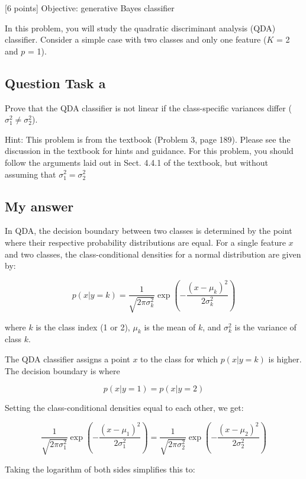 \documentclass[
]{article}
\begin{document}
{[}6 points{]} Objective: generative Bayes classifier

In this problem, you will study the quadratic discriminant analysis
(QDA) classifier. Consider a simple case with two classes and only one
feature (\(K\) = 2 and \(p\) = 1).

\hypertarget{question-task-a}{%
\subsection{Question Task a}\label{question-task-a}}

Prove that the QDA classifier is not linear if the class-specific
variances differ (\(\sigma_1^2 \ne \sigma_2^2\)).

Hint: This problem is from the textbook (Problem 3, page 189). Please
see the discussion in the textbook for hints and guidance. For this
problem, you should follow the arguments laid out in Sect. 4.4.1 of the
textbook, but without assuming that \(\sigma_1^2 = \sigma_2^2\)

\hypertarget{my-answer-2}{%
\subsection{My answer}\label{my-answer-2}}

In QDA, the decision boundary between two classes is determined by the
point where their respective probability distributions are equal. For a
single feature \(x\) and two classes, the class-conditional densities
for a normal distribution are given by:

\[ 
p(x | y = k) = \frac{1}{\sqrt{2\pi\sigma_k^2}} \exp\left(-\frac{(x - \mu_k)^2}{2\sigma_k^2}\right) 
\]

where \(k\) is the class index (1 or 2), \(\mu_k\) is the mean of \(k\),
and \(\sigma_k^2\) is the variance of class \(k\).

The QDA classifier assigns a point \(x\) to the class for which
\(p(x | y = k)\) is higher. The decision boundary is where

\[ 
p(x | y = 1) = p(x | y = 2) 
\]

Setting the class-conditional densities equal to each other, we get:

\[ 
\frac{1}{\sqrt{2\pi\sigma_1^2}} \exp\left(-\frac{(x - \mu_1)^2}{2\sigma_1^2}\right) = \frac{1}{\sqrt{2\pi\sigma_2^2}} \exp\left(-\frac{(x - \mu_2)^2}{2\sigma_2^2}\right) 
\]

Taking the logarithm of both sides simplifies this to:
\end{document}
